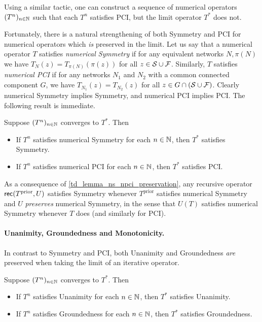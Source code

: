 Using a similar tactic, one can construct a sequence of numerical operators
$(T^n)_{n \in \mathbb{N}}$ such that each $T^n$ satisfies PCI, but the limit operator
$T^*$ does not.

Fortunately, there is a natural strengthening of both Symmetry and PCI for
numerical operators which \emph{is} preserved in the limit. Let us say that a
numerical operator $T$ satisfies \emph{numerical Symmetry} if for any
equivalent networks $N, \pi(N)$ we have $T_N(z) = T_{\pi(N)}(\pi(z))$ for all
$z \in \mathcal{S} \cup \mathcal{F}$. Similarly, $T$ satisfies \emph{numerical PCI} if for any
networks $N_1$ and $N_2$ with a common connected component $G$, we have
$T_{N_1}(z) = T_{N_2}(z)$ for all $z \in G \cap (\mathcal{S} \cup \mathcal{F})$. Clearly
numerical Symmetry implies Symmetry, and numerical PCI implies PCI. The
following result is immediate.

\begin{lemma}
    \label{td_lemma_ns_npci_preservation}
    Suppose $(T^n)_{n \in \mathbb{N}}$ converges to $T^*$. Then
    \begin{itemize}
        \item If $T^n$ satisfies numerical Symmetry for each $n \in \mathbb{N}$, then
              $T^*$ satisfies Symmetry.
        \item If $T^n$ satisfies numerical PCI for each $n \in \mathbb{N}$, then
              $T^*$ satisfies PCI.
    \end{itemize}
\end{lemma}

As a consequence of \cref{td_lemma_ns_npci_preservation}, any recursive
operator $\mathsf{rec}(T^\text{prior}, U)$ satisfies Symmetry whenever
$T^{\text{prior}}$ satisfies numerical Symmetry and $U$ \emph{preserves}
numerical Symmetry, in the sense that $U(T)$ satisfies numerical Symmetry
whenever $T$ does (and similarly for PCI).

\paragraph{Unanimity, Groundedness and Monotonicity.} In contrast to Symmetry
and PCI, both Unanimity and Groundedness \emph{are} preserved when taking the
limit of an iterative operator.

\begin{lemma}
    \label{td_lemma_unam_groundedness_preservation}
    Suppose $(T^n)_{n \in \mathbb{N}}$ converges to $T^*$. Then

    \begin{itemize}
        \item If $T^n$ satisfies Unanimity for each $n \in \mathbb{N}$, then $T^*$
              satisfies Unanimity.
        \item If $T^n$ satisfies Groundedness for each $n \in \mathbb{N}$, then $T^*$
              satisfies Groundedness.
    \end{itemize}
\end{lemma}

